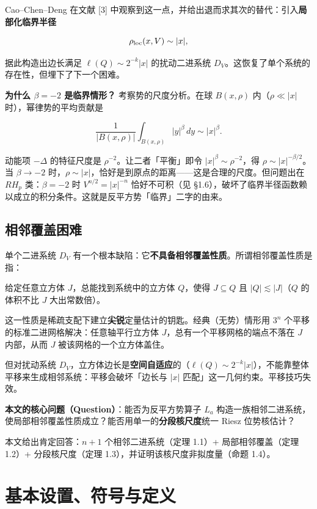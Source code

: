 \documentclass[a4paper,11pt,openany]{ctexbook}
\numberwithin{equation}{chapter}
\numberwithin{figure}{chapter}
\numberwithin{table}{chapter}
\begin{document}
Cao–Chen–Deng 在文献 [3] 中观察到这一点，并给出退而求其次的替代：引入\textbf{局部化临界半径}

$$\rho_{\rm loc}(x,V)\sim |x|,$$

据此构造出边长满足 $\ell(Q)\sim 2^{-k}|x|$ 的扰动二进系统 $D_V$。这恢复了单个系统的存在性，但埋下了下一个困难。

\textbf{为什么 $\beta=-2$ 是临界情形？} 考察势的尺度分析。在球 $B(x,\rho)$ 内（$\rho\ll|x|$ 时），幂律势的平均贡献是

$$\frac1{|B(x,\rho)|}\int_{B(x,\rho)}|y|^\beta\,dy \sim |x|^\beta .$$

动能项 $-\Delta$ 的特征尺度是 $\rho^{-2}$。让二者「平衡」即令 $|x|^\beta\sim\rho^{-2}$，得 $\rho\sim|x|^{-\beta/2}$。当 $\beta\to-2$ 时，$\rho\sim|x|$，恰好是到原点的距离——这是合理的尺度。但问题出在 $RH_p$ 类：$\beta=-2$ 时 $V^{n/2}=|x|^{-n}$ 恰好不可积（见 §1.6），破坏了临界半径函数赖以成立的积分条件。这就是反平方势「临界」二字的由来。

\subsection{相邻覆盖困难}

单个二进系统 $D_V$ 有一个根本缺陷：它\textbf{不具备相邻覆盖性质}。所谓相邻覆盖性质是指：

\begin{quotebox}
给定任意立方体 $J$，总能找到系统中的立方体 $Q$，使得 $J\subseteq Q$ 且 $|Q|\lesssim |J|$（$Q$ 的体积不比 $J$ 大出常数倍）。
\end{quotebox}

这一性质是稀疏支配下建立\textbf{尖锐}定量估计的钥匙。经典（无势）情形用 $3^n$ 个平移的标准二进网格解决：任意轴平行立方体 $J$，总有一个平移网格的端点不落在 $J$ 内部，从而 $J$ 被该网格的一个立方体盖住。

但对扰动系统 $D_V$，立方体边长是\textbf{空间自适应}的（$\ell(Q)\sim 2^{-k}|x|$），不能靠整体平移来生成相邻系统：平移会破坏「边长与 $|x|$ 匹配」这一几何约束。平移技巧失效。

\textbf{本文的核心问题（Question）}：能否为反平方势算子 $L_a$ 构造一族相邻二进系统，使局部相邻覆盖性质成立？能否用单一的\textbf{分段核尺度}统一 Riesz 位势核估计？

本文给出肯定回答：$n+1$ 个相邻二进系统（定理 1.1）+ 局部相邻覆盖（定理 1.2）+ 分段核尺度（定理 1.3），并证明该核尺度非拟度量（命题 1.4）。

\section{基本设置、符号与定义}
\end{document}
